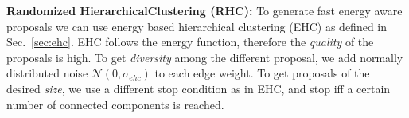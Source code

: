 \documentclass[10pt,twocolumn,letterpaper]{article}
\DeclareMathOperator*{\argmin}{arg\,min}
\DeclareMathOperator*{\argmax}{arg\,max}
\theoremstyle{definition}
\begin{document}
%



\noindent \textbf{Randomized HierarchicalClustering (RHC):}
%
To generate fast energy aware proposals we can use energy
based hierarchical clustering (EHC) as defined in Sec.~\ref{sec:ehc}.
EHC follows the energy function, therefore the \emph{quality}
of the proposals is high.
To get \emph{diversity} among the different proposal,
we add normally distributed noise  $\mathcal{N}(0, \sigma_{ehc})$
to each edge weight.
To get proposals of the desired \emph{size}, we use a
different stop condition as in EHC, and stop iff a certain number of connected
components is reached.
\end{document}
